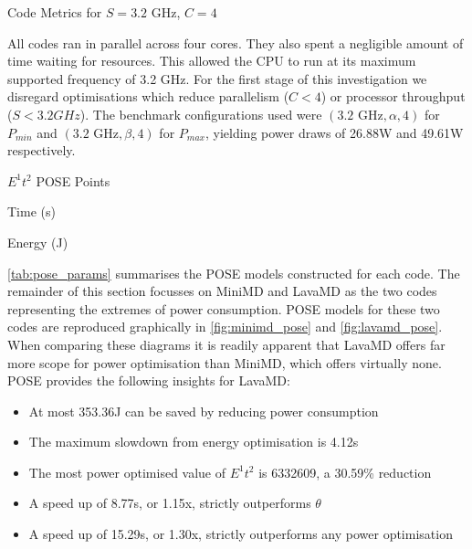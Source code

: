 \begin{table}
\centering
\caption{Code Metrics for $S = 3.2\text{ GHz}$, $C = 4$}
\label{tab:code_metrics}

\end{table}

All codes ran in parallel across four cores.
They also spent a negligible amount of time waiting for resources. 
This allowed the CPU to run at its maximum supported frequency of 3.2 GHz.
For the first stage of this investigation we disregard optimisations which reduce parallelism ($C < 4$) or processor throughput ($S < 3.2GHz$).
The benchmark configurations used were $(\text{3.2 GHz}, \alpha, 4)$ for $P_{min}$ and $(\text{3.2 GHz}, \beta, 4)$ for $P_{max}$, yielding power draws of 26.88W and 49.61W respectively.

\begin{table}
  \setlength{\tabcolsep}{.5em}
  \caption{$E^1t^2$ POSE Points}
  \begin{subtable}{\textwidth}
  \centering
  \caption{Time (s)}
  
  \end{subtable}
  \begin{subtable}{\textwidth}
  \centering
  \caption{Energy (J)}
  
  \end{subtable}
  \label{tab:pose_params}
\end{table}

\autoref{tab:pose_params} summarises the POSE models constructed for each code.
The remainder of this section focusses on MiniMD and LavaMD as the two codes representing the extremes of power consumption.
POSE models for these two codes are reproduced graphically in \autoref{fig:minimd_pose} and \autoref{fig:lavamd_pose}.
When comparing these diagrams it is readily apparent that LavaMD offers far more scope for power optimisation than MiniMD, which offers virtually none. 
POSE provides the following insights for LavaMD:
\begin{itemize}
  \item At most 353.36J can be saved by reducing power consumption
  \item The maximum slowdown from energy optimisation is 4.12s
  \item The most power optimised value of $E^1t^2$ is 6332609, a 30.59\% reduction
  \item A speed up of 8.77s, or 1.15x, strictly outperforms $\theta$
  \item A speed up of 15.29s, or 1.30x, strictly outperforms any power optimisation
\end{itemize}

